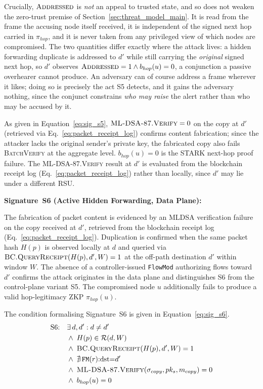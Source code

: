 \documentclass[12pt, a4paper]{report}
\begin{document}
Crucially, $\textsc{Addressed}$ is \emph{not} an appeal to trusted state, and
so does not weaken the zero-trust premise of
Section~\ref{sec:threat_model_main}. It is read from the frame the accusing
node itself received, it is independent of the signed next hop carried in
$\pi_{hop}$, and it is never taken from any privileged view of which nodes are
compromised. The two quantities differ exactly where the attack lives: a hidden
forwarding duplicate is addressed to $d'$ while still carrying the
\emph{original} signed next hop, so $d'$ observes
$\textsc{Addressed}=1 \wedge b_{hop}(u)=0$, a conjunction a passive overhearer
cannot produce. An adversary can of course address a frame wherever it likes;
doing so is precisely the act S5 detects, and it gains the adversary nothing,
since the conjunct constrains \emph{who may raise} the alert rather than who may
be accused by it.

As given in Equation~\eqref{eq:sig_s5},
$\textsc{ML-DSA-87.Verify}=0$ on the copy at $d'$
(retrieved via Eq.~\ref{eq:packet_receipt_log})
confirms content fabrication; since the attacker lacks
the original sender's private key, the fabricated copy
also fails \textsc{BatchVerify} at the aggregate level.
$b_{hop}(u) = 0$ is the \ac{STARK} next-hop proof
failure. The \textsc{ML-DSA-87.Verify} result at $d'$
is evaluated from the blockchain receipt log
(Eq.~\ref{eq:packet_receipt_log}) rather than locally,
since $d'$ may lie under a different \ac{RSU}.



\textbf{Signature~S6 (Active Hidden Forwarding, Data Plane):}

The fabrication of packet content is evidenced by an
\ac{MLDSA} verification failure on the copy received
at $d'$, retrieved from the blockchain receipt log
(Eq.~\ref{eq:packet_receipt_log}). Duplication is
confirmed when the same packet hash $H(p)$ is
observed locally at $d$ and queried via
$\textsc{BC.QueryReceipt}(H(p),d',W)=1$ at the
off-path destination $d'$ within window $W$.
The absence of a controller-issued \texttt{FlowMod}
authorizing flows toward $d'$ confirms the attack
originates in the data plane and distinguishes S6
from the control-plane variant S5. The compromised
node $u$ additionally fails to produce a valid
hop-legitimacy \ac{ZKP} $\pi_{hop}(u)$.

The condition formalising Signature~S6 is given in
Equation~\eqref{eq:sig_s6}.
\begin{equation}
\begin{aligned}
\text{S6:}\quad
  & \exists\, d, d' : d \neq d' \\
  & \wedge\; H(p) \in \mathcal{R}(d, W) \\
  & \wedge\; \textsc{BC.QueryReceipt}(H(p), d', W)
    = 1 \\
  & \wedge\; \nexists\,\texttt{FM}(r){:}
    \text{dst}{=}d' \\
  & \wedge\; \textsc{ML-DSA-87.Verify}(
    \sigma_{copy}, pk_s, m_{copy}) = 0 \\
  & \wedge\; b_{hop}(u) = 0
\end{aligned}
\label{eq:sig_s6}
\end{equation}
\end{document}
